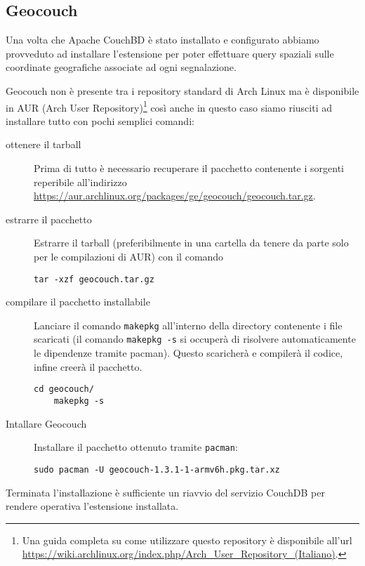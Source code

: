         \subsection{Geocouch}
            Una volta che Apache CouchBD\texttrademark{} è stato installato e 
            configurato abbiamo provveduto ad installare l'estensione per 
            poter effettuare query spaziali sulle coordinate geografiche 
            associate ad ogni segnalazione.
            
            Geocouch non è presente tra i repository standard di Arch Linux ma 
            è disponibile in AUR (Arch User Repository)\footnote{Una guida 
            completa su come utilizzare questo repository è disponibile 
            all'url 
            \url{https://wiki.archlinux.org/index.php/Arch_User_Repository_(Italiano)}.}
            così anche in questo caso siamo riusciti ad installare tutto con 
            pochi semplici comandi:
            \begin{description}
                \item[ottenere il tarball]
                Prima di tutto è necessario recuperare il pacchetto 
                contenente i sorgenti reperibile all'indirizzo 
                \url{https://aur.archlinux.org/packages/ge/geocouch/geocouch.tar.gz}.
                \item[estrarre il pacchetto]
                Estrarre il tarball (preferibilmente in una cartella da tenere 
                da parte solo per le compilazioni di AUR) con il comando
                \begin{lstlisting}[language=plane]
    tar -xzf geocouch.tar.gz
                \end{lstlisting}
                \item[compilare il pacchetto installabile]
                Lanciare il comando \texttt{makepkg} all'interno della directory
                contenente i file scaricati (il comando \texttt{makepkg -s} si 
                occuperà di risolvere automaticamente le dipendenze tramite 
                pacman). Questo scaricherà e compilerà il codice, infine 
                creerà il pacchetto.
                \begin{lstlisting}[language=plane]
    cd geocouch/
    makepkg -s
                \end{lstlisting}
                \item[Intallare Geocouch]
                Installare il pacchetto ottenuto tramite \texttt{pacman}:
                \begin{lstlisting}[language=plane]
    sudo pacman -U geocouch-1.3.1-1-armv6h.pkg.tar.xz
                \end{lstlisting}
            \end{description}
            Terminata l'installazione è sufficiente un riavvio del servizio 
            CouchDB per rendere operativa l'estensione installata.

